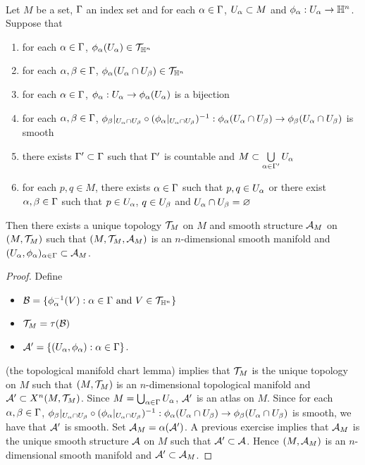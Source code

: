 \documentclass{book}
\begin{document}
		
	\begin{ex}   \\
		Let $M$ be a set, $\Gamma$ an index set and for each $\alpha \in \Gamma$, $U_{\alpha} \subset M$ and $\phi_{\alpha}: U_{\alpha} \rightarrow \mathbb{H}^n$. Suppose that 
		\begin{enumerate}[label=(\alph*)]
			\item for each $\alpha \in \Gamma$, $\phi_{\alpha}(U_{\alpha}) \in \mathcal{T}_{\mathbb{H}^n}$
			\item for each $\alpha, \beta \in \Gamma$, $\phi_{\alpha}(U_{\alpha} \cap U_{\beta}) \in \mathcal{T}_{\mathbb{H}^n}$
			\item for each $\alpha \in \Gamma$, $\phi_{\alpha}: U_{\alpha} \rightarrow \phi_{\alpha}(U_{\alpha})$ is a bijection
			\item for each $\alpha, \beta \in \Gamma$, $\phi_{\beta}|_{U_{\alpha} \cap U_{\beta}} \circ (\phi_{\alpha}|_{U_{\alpha} \cap U_{\beta}})^{-1}: \phi_{\alpha}(U_{\alpha} \cap U_{\beta}) \rightarrow \phi_{\beta}(U_{\alpha} \cap U_{\beta})$ is smooth
			\item there exists $\Gamma' \subset \Gamma$ such that $\Gamma'$ is countable and $M \subset \bigcup\limits_{\alpha \in \Gamma'} U_{\alpha}$
			\item for each $p,q \in M$, there exists $\alpha \in \Gamma$ such that $p,q \in U_{\alpha}$ or there exist $\alpha,\beta \in \Gamma$ such that $p \in U_{\alpha}$, $q \in U_{\beta}$ and $U_{\alpha} \cap U_{\beta} = \varnothing$
		\end{enumerate}
		Then there exists a unique topology $\mathcal{T}_M$ on $M$ and smooth structure $\mathcal{A}_M$ on $(M, \mathcal{T}_M)$ such that $(M, \mathcal{T}_M, \mathcal{A}_M)$ is an $n$-dimensional smooth manifold and $(U_{\alpha}, \phi_{\alpha})_{\alpha \in \Gamma} \subset \mathcal{A}_M$.
	\end{ex}
	
	\begin{proof}
		Define
		\begin{itemize}
			\item $\mathcal{B} = \{\phi_{\alpha}^{-1}(V): \alpha \in \Gamma \text{ and } V \in \mathcal{T}_{\mathbb{H}^n}\}$ 
			\item $\mathcal{T}_M = \tau(\mathcal{B})$ 
			\item $\mathcal{A}' = \{(U_{\alpha}, \phi_{\alpha}) : \alpha \in \Gamma\}$.
		\end{itemize}
		 (the topological manifold chart lemma) implies that $\mathcal{T}_M$ is the unique topology on $M$ such that $(M, \mathcal{T}_M)$ is an $n$-dimensional topological manifold and $\mathcal{A}' \subset X^n(M, \mathcal{T}_M)$. Since $M = \bigcup_{\alpha \in \Gamma} U_{\alpha}$, $\mathcal{A}'$ is an atlas on $M$. Since for each $\alpha, \beta \in \Gamma$, $\phi_{\beta}|_{U_{\alpha} \cap U_{\beta}} \circ (\phi_{\alpha}|_{U_{\alpha} \cap U_{\beta}})^{-1}: \phi_{\alpha}(U_{\alpha} \cap U_{\beta}) \rightarrow \phi_{\beta}(U_{\alpha} \cap U_{\beta})$ is smooth, we have that $\mathcal{A}'$ is smooth. Set $\mathcal{A}_M = \alpha(\mathcal{A}')$. A previous exercise implies that $\mathcal{A}_M$ is the unique smooth structure $\mathcal{A}$ on $M$ such that $\mathcal{A}' \subset \mathcal{A}$. Hence $(M, \mathcal{A}_M)$ is an $n$-dimensional smooth manifold and $\mathcal{A}' \subset \mathcal{A}_M$. 
	\end{proof}
	
\end{document}
